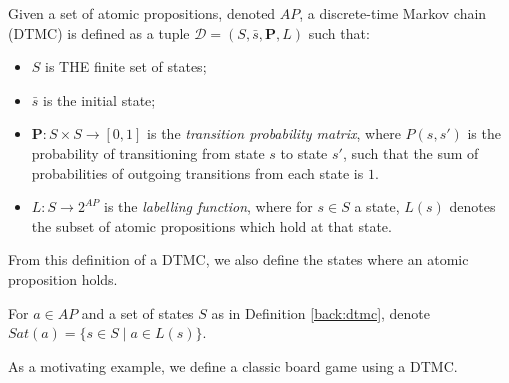 \begin{definition}
\label{back:dtmc}
    Given a set of atomic propositions, denoted $AP$, a discrete-time Markov chain (DTMC) is defined as a tuple $\mathcal{D} = (S, \bar{s}, \mathbf{P}, L)$ such that:

    \begin{itemize}
        \item $S$ is THE finite set of states;
        \item $\bar{s}$ is the initial state;
        \item $\mathbf{P} : S \times S \rightarrow [0,1]$ is the \emph{transition probability matrix}, where $P(s, s')$ is the probability of transitioning from state $s$ to state $s'$, such that the sum of probabilities of outgoing transitions from each state is $1$.
        \item $L: S \rightarrow 2^{AP}$ is the \emph{labelling function}, where for $s \in S$ a state, $L(s)$ denotes the subset of atomic propositions which hold at that state.
    \end{itemize}

\end{definition}

From this definition of a DTMC, we also define the states where an atomic proposition holds.

\begin{definition}
\label{back:sat}

    For $a \in AP$ and a set of states $S$ as in Definition \ref{back:dtmc}, denote $Sat(a) = \{s \in S \mid a \in L(s)\}$.

\end{definition}


As a motivating example, we define a classic board game using a DTMC.

